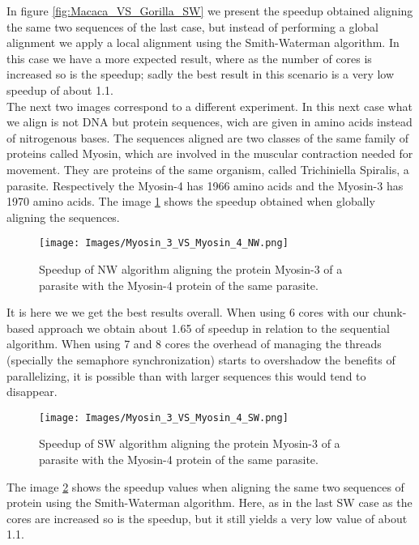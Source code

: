 \documentclass[journal]{IEEEtran}
\begin{document}
In figure \ref{fig:Macaca_VS_Gorilla_SW} we present the speedup obtained aligning the same two sequences of the last case, but instead of performing a global alignment we apply a local alignment using the Smith-Waterman algorithm. In this case we have a more expected result, where as the number of cores is increased so is the speedup; sadly the best result in this scenario is a very low speedup of about 1.1. \\

The next two images correspond to a different experiment. In this next case what we align is not DNA but protein sequences, wich are given in amino acids instead of nitrogenous bases. The sequences aligned are two classes of the same family of proteins called Myosin, which are involved in the muscular contraction needed for movement. They are proteins of the same organism, called Trichiniella Spiralis, a parasite. Respectively the Myosin-4 has 1966 amino acids and the Myosin-3 has 1970 amino acids. The image \ref{fig:Myosin3_VS_Myosin4_NW} shows the speedup obtained when globally aligning the sequences. 

\begin{figure}[h]
  \begin{center}
    \texttt{[image: Images/Myosin\_3\_VS\_Myosin\_4\_NW.png]}
  \end{center}
  \caption{Speedup of NW algorithm aligning the protein Myosin-3 of a parasite with the Myosin-4 protein of the same parasite.}
  \label{fig:Myosin3_VS_Myosin4_NW}
\end{figure}

It is here we we get the best results overall. When using 6 cores with our chunk-based approach we obtain about 1.65 of speedup in relation to the sequential algorithm. When using 7 and 8 cores the overhead of managing the threads (specially the semaphore synchronization) starts to overshadow the benefits of parallelizing, it is possible than with larger sequences this would tend to disappear. 

\begin{figure}[h]
  \begin{center}
    \texttt{[image: Images/Myosin\_3\_VS\_Myosin\_4\_SW.png]}
  \end{center}
  \caption{Speedup of SW algorithm aligning the protein Myosin-3 of a parasite with the Myosin-4 protein of the same parasite.}
  \label{fig:Myosin3_VS_Myosin4_SW}
\end{figure}

The image \ref{fig:Myosin3_VS_Myosin4_SW} shows the speedup values when aligning the same two sequences of protein using the Smith-Waterman algorithm. Here, as in the last SW case as the cores are increased so is the speedup, but it still yields a very low value of about 1.1. \\
\end{document}
